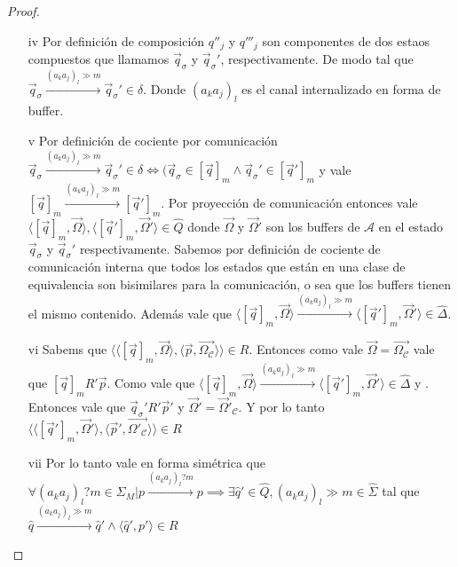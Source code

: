 \begin{proof}
\begin{itemize}
    \item[iv] Por definición de composición $q''_j$ y $q'''_j$ son componentes de dos estaos compuestos que llamamos $\overrightarrow{q}_{\sigma}$ y $\overrightarrow{q}_{\sigma}'$, respectivamente. De modo tal que $ \overrightarrow{q}_{\sigma} \xrightarrow{(a_ka_j)_l \gg m} \overrightarrow{q}_{\sigma}' \in \delta$. Donde $(a_ka_j)_l$ es el canal internalizado en forma de buffer.
    
    \item[v] Por definición de cociente por comunicación $\overrightarrow{q}_{\sigma} \xrightarrow{(a_ka_j)_l \gg m} \overrightarrow{q}_{\sigma}' \in \delta \iff (\overrightarrow{q}_{\sigma} \in [\overrightarrow{q}]_m \land \overrightarrow{q}_{\sigma}' \in [\overrightarrow{q}']_m$ y vale $[\overrightarrow{q}]_m \xrightarrow{(a_ka_j)_l \gg m} [\overrightarrow{q}']_m$. Por proyección de comunicación entonces vale $\langle [\overrightarrow{q}]_m, \overrightarrow{\Omega} \rangle, \langle [\overrightarrow{q}']_m, \overrightarrow{\Omega}' \rangle \in \hat{Q}$ donde $\overrightarrow{\Omega}$ y $\overrightarrow{\Omega}'$ son los buffers de $\mathcal{A}$ en el estado $\overrightarrow{q}_{\sigma}$ y $\overrightarrow{q}_{\sigma}'$ respectivamente. Sabemos por definición de cociente de comunicación interna que todos los estados que están en una clase de equivalencia son bisimilares para la comunicación, o sea que los buffers tienen el mismo contenido. Además vale que $\langle [\overrightarrow{q}]_m, \overrightarrow{\Omega} \rangle \xrightarrow{(a_ka_j)_l \gg m} \langle [\overrightarrow{q}']_m, \overrightarrow{\Omega}' \rangle \in \hat{\Delta}$.
        
    \item[vi] Sabems que $\langle \langle [\overrightarrow{q}]_m, \overrightarrow{\Omega} \rangle, \langle \overrightarrow{p}, \overrightarrow{\Omega_\mathcal{C}} \rangle \rangle \in R$. Entonces como vale $\overrightarrow{\Omega}=\overrightarrow{\Omega_\mathcal{C}}$ vale que $[\overrightarrow{q}]_mR'\overrightarrow{p} $. Como vale que $\langle [\overrightarrow{q}]_m, \overrightarrow{\Omega} \rangle \xrightarrow{(a_ka_j)_l \gg m} \langle [\overrightarrow{q}']_m, \overrightarrow{\Omega}' \rangle \in \hat{\Delta}$ y . Entonces vale que $\overrightarrow{q}_{\sigma}'R'\overrightarrow{p}'$ y $\overrightarrow{\Omega}' = \overrightarrow{\Omega}'_\mathcal{C}$. Y por lo tanto $\langle \langle [\overrightarrow{q}']_m, \overrightarrow{\Omega}' \rangle, \langle \overrightarrow{p}', \overrightarrow{\Omega'_\mathcal{C}} \rangle \rangle \in R$
    
    \item[vii] Por lo tanto vale en forma simétrica que $\forall (a_ka_j)_l?m \in \Sigma_M | p \xrightarrow{(a_ka_j)_l?m} p \implies \exists \hat{q}' \in \hat{Q}, (a_ka_j)_l \gg m \in \hat{\Sigma}$ tal que $\hat{q} \xrightarrow{(a_ka_j)_l \gg m} \hat{q}' \land \langle \hat{q}', p'\rangle \in R$
    
\end{itemize}


\end{proof}

